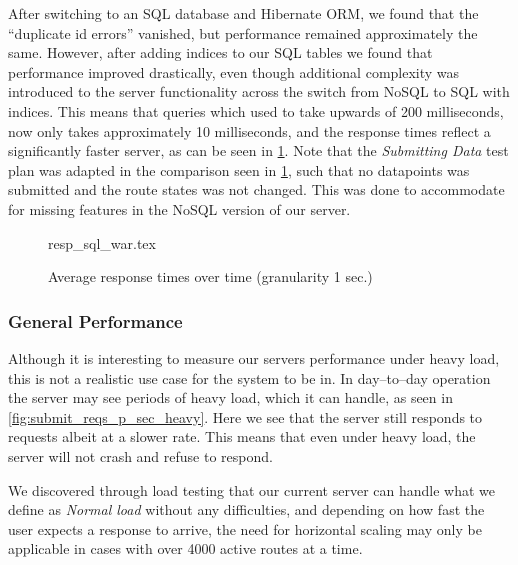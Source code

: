 After switching to an SQL database and Hibernate ORM, we found that the \enquote{duplicate id errors} vanished, but performance remained approximately the same.
However, after adding indices to our SQL tables we found that performance improved drastically, even though additional complexity was introduced to the server functionality across the switch from NoSQL to SQL with indices.
This means that queries which used to take upwards of 200 milliseconds, now only takes approximately 10 milliseconds, and the response times reflect a significantly faster server, as can be seen in \cref{fig:nosql_vs_sql}.
Note that the \textit{Submitting Data} test plan was adapted in the comparison seen in \cref{fig:nosql_vs_sql}, such that no datapoints was submitted and the route states was not changed.
This was done to accommodate for missing features in the NoSQL version of our server.

\begin{figure}[!htb]
    \centering
    \footnotesize
    {resp_sql_war.tex}
    \caption{Average response times over time (granularity 1 sec.)}\label{fig:nosql_vs_sql}
\end{figure}

\subsubsection*{General Performance}
Although it is interesting to measure our servers performance under heavy load, this is not a realistic use case for the system to be in.
In day--to--day operation the server may see periods of heavy load, which it can handle, as seen in \cref{fig:submit_reqs_p_sec_heavy}. %
Here we see that the server still responds to requests albeit at a slower rate.
This means that even under heavy load, the server will not crash and refuse to respond.

We discovered through load testing that our current server can handle what we define as \textit{Normal load} without any difficulties, and depending on how fast the user expects a response to arrive, the need for horizontal scaling may only be applicable in cases with over 4000 active routes at a time.
